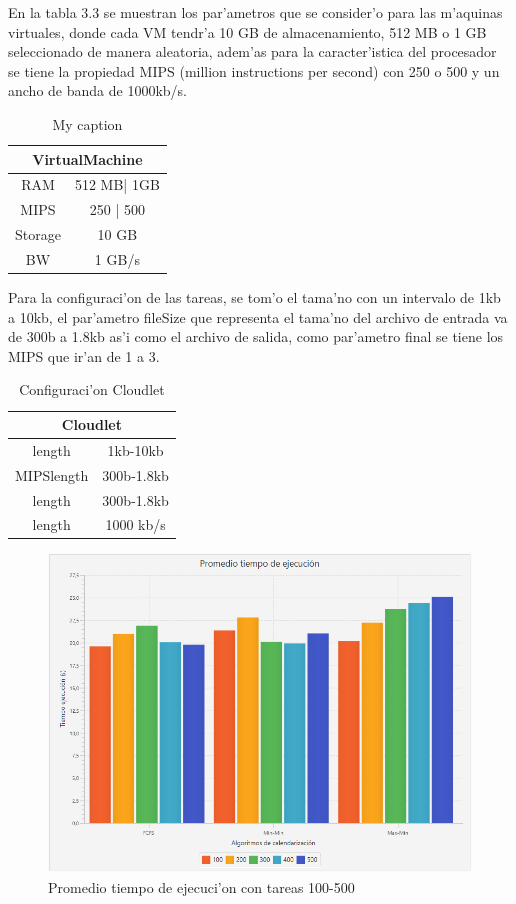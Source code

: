 En la tabla 3.3 se muestran los par'ametros que se consider'o para las m'aquinas virtuales, donde cada VM tendr'a 10 GB de almacenamiento, 512 MB  o 1 GB seleccionado de manera aleatoria, adem'as para la caracter'istica del procesador se tiene  la propiedad MIPS (million instructions per second) con 250 o 500 y un ancho de banda de 1000kb/s.


\begin{table}[]
	\centering
	\caption{My caption}
	\label{my-label}
	\begin{tabular}{@{}cc@{}}
		\toprule
		\multicolumn{2}{c}{{\bf VirtualMachine}} \\ \midrule
		RAM               & 512 MB| 1GB          \\
		MIPS              & 250 | 500            \\
		Storage           & 10 GB                \\ \midrule
		BW                & 1 GB/s              
	\end{tabular}
\end{table}
\bigskip
Para la configuraci'on de las tareas, se tom'o el tama'no con un intervalo de 1kb a 10kb,  el par'ametro fileSize que representa el tama'no del archivo de entrada va de 300b a 1.8kb as'i como el archivo de salida, como par'ametro final se tiene los MIPS que ir'an de 1 a 3.



\begin{table}[]
	\centering
	\caption{Configuraci'on Cloudlet}
	\label{my-label}
	\begin{tabular}{@{}cc@{}}
		\toprule
		\multicolumn{2}{c}{{\bf Cloudlet}} \\ \midrule
		length           & 1kb-10kb        \\
		MIPSlength       & 300b-1.8kb      \\
		length           & 300b-1.8kb      \\ \midrule
		length           & 1000 kb/s      
	\end{tabular}
\end{table}

\begin{figure}
	\caption{Promedio tiempo de ejecuci'on con tareas 100-500}
	\centering
	\includegraphics[scale=0.5]{media/tiempoejecucion}
\end{figure}

